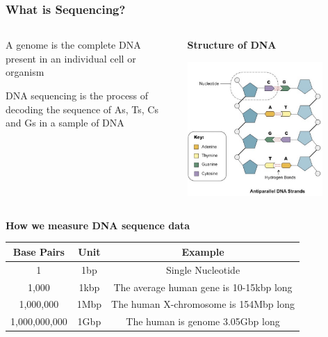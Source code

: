 \documentclass{beamer}
\begin{document}
	
	\begin{frame}
		\frametitle{What is Sequencing?}


\begin{columns}

\begin{column}{0.5\textwidth}

\centering		A genome is the complete DNA present in an individual cell or organism\\
\vspace{10pt}

DNA sequencing is the process of decoding the sequence of As, Ts, Cs and Gs in a sample of DNA 
\vspace{10pt}
\end{column}	
	\begin{column}{0.5\textwidth}
		\centering \textbf{Structure of DNA}
		
		\includegraphics[keepaspectratio, width  =0.8\textwidth]{img/DNA_cartoon}
	\end{column}	
\end{columns}		\pause
	\textbf{How we measure DNA sequence data}
\centering
\small		
\begin{tabular}{|c|c|c|}
	\hline
	\textbf{Base Pairs} & \textbf{Unit} & \textbf{Example} \\
	\hline
	1 & 1bp & Single Nucleotide \\
	\hline
	1,000 & 1kbp & The average human gene is 10-15kbp long\\
	\hline
	1,000,000 & 1Mbp & The human X-chromosome is 154Mbp long \\
	\hline
	1,000,000,000 & 1Gbp & The human is genome 3.05Gbp long \\
	\hline
\end{tabular}
\end{frame}
\end{document}
